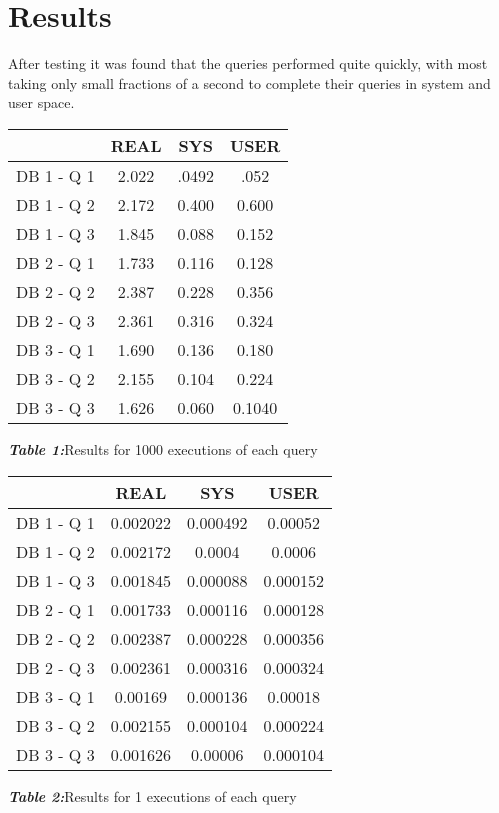 \documentclass[12pt]{article}
\theoremstyle{plain}
\theoremstyle{definition}
\begin{document}
\section*{Results}
After testing it was found that the queries performed quite quickly, with most taking only small fractions of a second to complete their queries in system and user space.
\begin{center}
 \begin{tabular}{||c c c c||} 
 \hline
  & REAL & SYS & USER \\ [0.5ex] 
 \hline\hline
 DB 1 - Q 1 & 2.022 & .0492 & .052 \\ 
 \hline
 DB 1 - Q 2 & 2.172 & 0.400 & 0.600 \\
 \hline
 DB 1 - Q 3 & 1.845 & 0.088 & 0.152 \\
 \hline
 DB 2 - Q 1 & 1.733 & 0.116 & 0.128\\
 \hline
 DB 2 - Q 2 & 2.387 & 0.228 & 0.356 \\ 
 \hline
 DB 2 - Q 3 & 2.361 & 0.316 & 0.324 \\
 \hline
 DB 3 - Q 1 & 1.690 & 0.136 & 0.180 \\
 \hline
 DB 3 - Q 2 & 2.155 & 0.104 & 0.224 \\
 \hline
 DB 3 - Q 3 & 1.626 & 0.060 & 0.1040 \\[1ex] 
 \hline
\end{tabular}
\centerline{\textit{\textbf{Table 1:}}Results for 1000 executions of each query}
\end{center}
\begin{center}
 \begin{tabular}{||c c c c||} 
 \hline
  & REAL & SYS & USER \\ [0.5ex] 
 \hline\hline
 DB 1 - Q 1 & 0.002022 & 0.000492 & 0.00052 \\ 
 \hline
 DB 1 - Q 2 & 0.002172 & 0.0004 & 0.0006 \\
 \hline
 DB 1 - Q 3 & 0.001845 & 0.000088 & 0.000152 \\
 \hline
 DB 2 - Q 1 & 0.001733 & 0.000116 & 0.000128 \\
 \hline
 DB 2 - Q 2 & 0.002387 & 0.000228 & 0.000356 \\ 
 \hline
 DB 2 - Q 3 & 0.002361 & 0.000316 & 0.000324 \\
 \hline
 DB 3 - Q 1 & 0.00169 & 0.000136 & 0.00018 \\
 \hline
 DB 3 - Q 2 & 0.002155 & 0.000104 & 0.000224 \\
 \hline
 DB 3 - Q 3 & 0.001626 & 0.00006 & 0.000104 \\[1ex] 
 \hline
\end{tabular}
\centerline{\textit{\textbf{Table 2:}}Results for 1 executions of each query}
\end{center}
\end{document}
